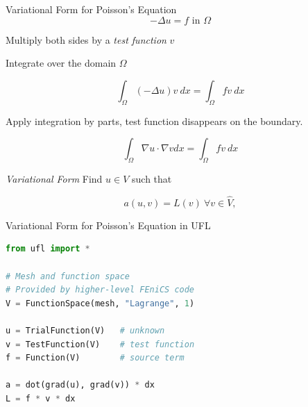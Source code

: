 \begin{frame}{Variational Form for Poisson's Equation}
$$
- \Delta u = f \text{ in } \Omega
$$

Multiply both sides by a \textit{test function} $v$

Integrate over the domain $\Omega$

$$
\int_{\Omega}(-\Delta u) v \ dx = \int_{\Omega} f v \ dx
$$

Apply integration by parts, test function disappears on the boundary.

$$
\int_{\Omega} \nabla u \cdot \nabla v dx = \int_{\Omega} f v \ dx
$$


\textit{Variational Form}
Find $u \in V$ such that

$$
a(u, v) = L(v) \ \forall v \in \hat{V},
$$
\end{frame}

\begin{frame}[fragile]{Variational Form for Poisson's Equation in UFL}
\begin{lstlisting}[language=Python]
from ufl import *

# Mesh and function space 
# Provided by higher-level FEniCS code
V = FunctionSpace(mesh, "Lagrange", 1)

u = TrialFunction(V)   # unknown
v = TestFunction(V)    # test function
f = Function(V)        # source term

a = dot(grad(u), grad(v)) * dx
L = f * v * dx
\end{lstlisting}
\end{frame}


